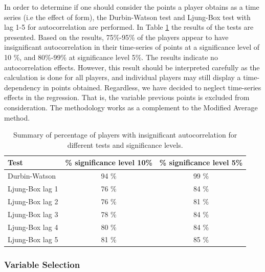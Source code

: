 In order to determine if one should consider the points a player obtains as a time series (i.e the effect of form), the Durbin-Watson test and Ljung-Box test with lag 1-5 for autocorrelation are performed. In Table \ref{tab:auto_tests} the results of the tests are presented. Based on the results, 75\%-95\% of the players appear to have insignificant autocorrelation in their time-series of points at a significance level of 10 \%, and 80\%-99\% at significance level 5\%. The results indicate no autocorrelation effects. However, this result should be interpreted carefully as the calculation is done for all players, and individual players may still display a time-dependency in points obtained. Regardless, we have decided to neglect time-series effects in the regression. That is, the variable previous points is excluded from consideration. The methodology works as a complement to the Modified Average method.

\begin{table}[H]
\centering
\begin{tabular}{|l|c|c|}
\hline
Test            & \% significance level 10\% & \% significance level 5\% \\
\hline
Durbin-Watson   & 94 \% & 99 \%                                            \\
Ljung-Box lag 1 & 76 \% & 84 \%                                            \\
Ljung-Box lag 2 & 76 \% & 81 \%                                            \\
Ljung-Box lag 3 & 78 \% & 84 \%                                            \\
Ljung-Box lag 4 & 80 \% & 84 \%                                           \\
Ljung-Box lag 5 & 81 \% & 85 \%                
\\
\hline
\end{tabular}
\caption{Summary of percentage of players with insignificant autocorrelation for different tests and significance levels.}
\label{tab:auto_tests}
\end{table}

\subsubsection{Variable Selection}

